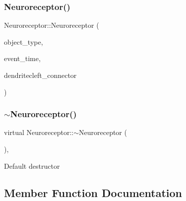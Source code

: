 \mbox{\label{classNeuroreceptor_ab002bab3b4ffeed402f60e574ce0263e}} 
\subsubsection{\texorpdfstring{Neuroreceptor()}{Neuroreceptor()}\hspace{0.1cm}{\footnotesize\ttfamily [4/4]}}
{\footnotesize\ttfamily Neuroreceptor\+::\+Neuroreceptor (\begin{DoxyParamCaption}\item[{unsigned int}]{object\+\_\+type,  }\item[{std\+::chrono\+::time\+\_\+point$<$ \mbox{\hyperlink{universe_8h_a0ef8d951d1ca5ab3cfaf7ab4c7a6fd80}{Clock}} $>$}]{event\+\_\+time,  }\item[{\mbox{\hyperlink{classDendriteCleft}{Dendrite\+Cleft}} \&}]{dendritecleft\+\_\+connector }\end{DoxyParamCaption})\hspace{0.3cm}{\ttfamily [inline]}}

\mbox{\label{classNeuroreceptor_ac9c1e9e985ed85712c14c85e306bebc9}} 
\subsubsection{\texorpdfstring{$\sim$\+Neuroreceptor()}{~Neuroreceptor()}}
{\footnotesize\ttfamily virtual Neuroreceptor\+::$\sim$\+Neuroreceptor (\begin{DoxyParamCaption}{ }\end{DoxyParamCaption})\hspace{0.3cm}{\ttfamily [inline]}, {\ttfamily [virtual]}}

Default destructor 

\subsection{Member Function Documentation}
\mbox{\label{classNeuroreceptor_a900b21f6feb6334d4ff8a3fd5244bf05}} 
